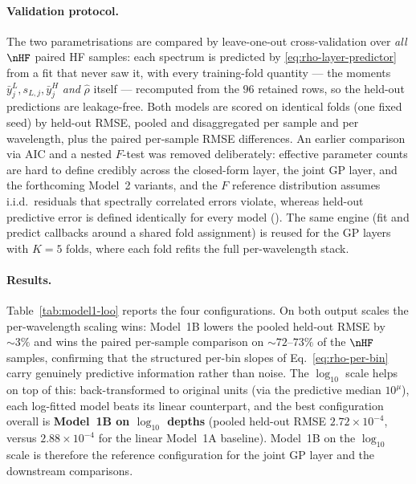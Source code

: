 \paragraph{Validation protocol.}
The two parametrisations are compared by leave-one-out cross-validation over
\emph{all} $\nHF$ paired HF samples: each spectrum is predicted by
\eqref{eq:rho-layer-predictor} from a fit that never saw it, with every
training-fold quantity --- the moments
$\bar y^{L}_{j},s_{L,j},\bar y^{H}_{j}$ \emph{and} $\hat\rho$ itself ---
recomputed from the $96$ retained rows, so the held-out predictions are
leakage-free. Both models are scored on identical folds (one fixed seed) by
held-out RMSE, pooled and disaggregated per sample and per wavelength, plus
the paired per-sample RMSE differences. An earlier comparison via AIC and a
nested $F$-test was removed deliberately: effective parameter counts are hard
to define credibly across the closed-form layer, the joint GP layer, and the
forthcoming Model~2 variants, and the $F$ reference distribution assumes
i.i.d.\ residuals that spectrally correlated errors violate, whereas held-out
predictive error is defined identically for every model
(). The same engine (fit and predict
callbacks around a shared fold assignment) is reused for the GP layers with
$K=5$ folds, where each fold refits the full per-wavelength stack.

\paragraph{Results.}
Table~\ref{tab:model1-loo} reports the four configurations. On both output
scales the per-wavelength scaling wins: Model~1B lowers the pooled held-out
RMSE by ${\sim}3\%$ and wins the paired per-sample comparison on
${\sim}72$--$73\%$ of the $\nHF$ samples, confirming that the structured
per-bin slopes of Eq.~\ref{eq:rho-per-bin} carry genuinely predictive
information rather than noise. The $\log_{10}$ scale helps on top of this:
back-transformed to original units (via the predictive median $10^{\mu}$),
each log-fitted model beats its linear counterpart, and the best
configuration overall is \textbf{Model~1B on $\log_{10}$ depths} (pooled
held-out RMSE $2.72\times10^{-4}$, versus $2.88\times10^{-4}$ for the linear
Model~1A baseline). Model~1B on the $\log_{10}$ scale is therefore the
reference configuration for the joint GP layer and the downstream comparisons.

